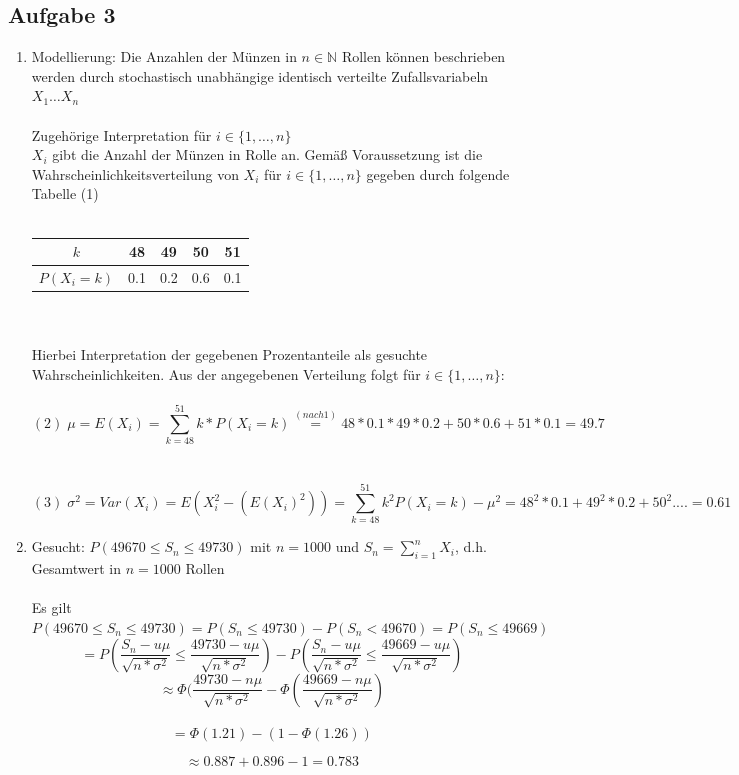 \documentclass[10pt,a4paper]{article}
\begin{document}
\subsection{Aufgabe 3}
\begin{enumerate}[label=(\alph*)]
	\item Modellierung: Die Anzahlen der Münzen in $n\in \mathbb{N}$ Rollen können beschrieben werden durch stochastisch unabhängige identisch verteilte Zufallsvariabeln $X_1\dots X_n$\\~\\
	Zugehörige Interpretation für $i \in \{1,\dots , n\}$\\
$X_i$ gibt die Anzahl der Münzen in Rolle an. Gemäß Voraussetzung ist die Wahrscheinlichkeitsverteilung von $X_i$ für $i \in \{1,\dots ,  n \}$ gegeben durch folgende Tabelle (1)\\~\\
\begin{tabular}{|c|c|c|c|c|}
	\hline $k$ & 48 & 49 & 50 & 51 \\ 
	\hline $P(X_i=k)$ & 0.1 & 0.2 & 0.6 & 0.1 \\ 
	\hline 
\end{tabular} \\~\\
Hierbei Interpretation der gegebenen Prozentanteile als gesuchte Wahrscheinlichkeiten. Aus der angegebenen Verteilung folgt für $i \in \{1,\dots,n\}$:\\~\\
$$(2)\; \mu = E(X_i) = \sum_{k=48}^{51}k*P(X_i=k) \overset{(nach 1)}{=}  48*0.1*49*0.2+50*0.6+51*0.1=49.7$$\\~\\
$$(3)\; \sigma^2 = Var(X_i) = E(X_i^2 - (E(X_i)^2)) = \sum_{k=48}^{51}k^2 P(X_i=k)- \mu^2 =48^2*0.1+49^2*0.2+50^2.... = 0.61$$

\item Gesucht: $P(49 670 \leq S_n \leq 49 730)$ mit $n=1000$ und $S_n = \sum_{i=1}^{n}X_i$, d.h. Gesamtwert in $n=1000$ Rollen\\~\\
Es gilt $P(49 670\leq S_n \leq 49 730) = P(S_n  \leq 49 730) - P(S_n < 49 670) =  P(S_n \leq 49669)$\\
$$= P(\frac{S_n-u\mu}{\sqrt{n*\sigma^2}}\leq \frac{49730-u\mu}{\sqrt{n*\sigma^2}}) - P(\frac{S_n-u\mu}{\sqrt{n*\sigma^2}}\leq \frac{49669-u\mu}{\sqrt{n*\sigma^2}})$$ 
$$\approx \Phi (\frac{49730-n\mu}{\sqrt{n*\sigma^2}}- \Phi (\frac{49669-n\mu}{\sqrt{n*\sigma^2}})$$\\
$$=\Phi(1.21)-(1-\Phi(1.26)) $$

$$\approx 0.887 + 0.896 - 1 = 0.783$$
\end{enumerate}
\end{document}
